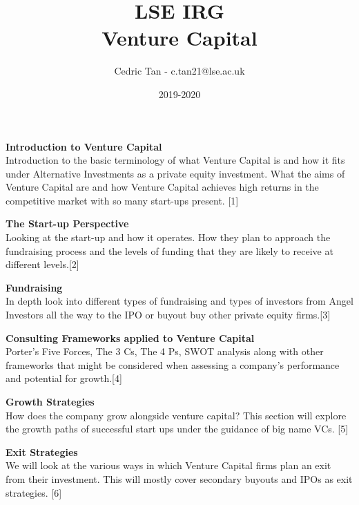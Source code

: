 \documentclass[a4paper]{article}
\title{LSE IRG\\
		Venture Capital}
\author{Cedric Tan - c.tan21@lse.ac.uk}
\date {2019-2020}
\begin{document}
\maketitle
{\small
  \noindent\textbf{Introduction to Venture Capital}\\
  Introduction to the basic terminology of what Venture Capital is and how it fits under Alternative Investments as a private equity investment. What the aims of Venture Capital are and how Venture Capital achieves high returns in the competitive market with so many start-ups present. \hspace*{\fill}[1]

  \vspace{10pt}
  \noindent\textbf{The Start-up Perspective}\\
  Looking at the start-up and how it operates. How they plan to approach the fundraising process and the levels of funding that they are likely to receive at different levels.\hspace*{\fill}[2]
   
  \vspace{10pt}
  \noindent\textbf{Fundraising}\\
  \noindent In depth look into different types of fundraising and types of investors from Angel Investors all the way to the IPO or buyout buy other private equity firms.\hspace*{\fill}[3]

  \vspace{10pt}
  \noindent\textbf{Consulting Frameworks applied to Venture Capital}\\
  Porter's Five Forces, The 3 Cs, The 4 Ps, SWOT analysis along with other frameworks that might be considered when assessing a company's performance and potential for growth.\hspace*{\fill}[4]

  \vspace{10pt}
  \noindent\textbf{Growth Strategies}\\
  How does the company grow alongside venture capital? This section will explore the growth paths of successful start ups under the guidance of big name VCs.  \hspace*{\fill}[5]

  \vspace{10pt}
  \noindent\textbf{Exit Strategies}\\
  We will look at the various ways in which Venture Capital firms plan an exit from their investment. This will mostly cover secondary buyouts and IPOs as exit strategies. \hspace*{\fill}[6]

}
\end{document}
